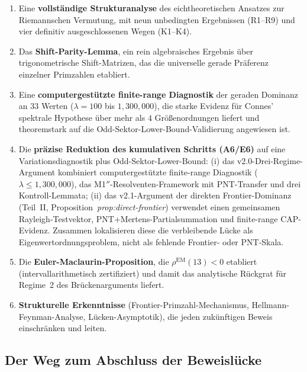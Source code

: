 \documentclass[12pt,a4paper]{article}
\theoremstyle{definition}
\theoremstyle{remark}
\begin{document}
\begin{enumerate}
  \item Eine \textbf{vollständige Strukturanalyse} des eichtheoretischen Ansatzes zur Riemannschen Vermutung, mit neun unbedingten Ergebnissen (R1--R9) und vier definitiv ausgeschlossenen Wegen (K1--K4).

  \item Das \textbf{Shift-Parity-Lemma}, ein rein algebraisches Ergebnis über trigonometrische Shift-Matrizen, das die universelle gerade Präferenz einzelner Primzahlen etabliert.

  \item Eine \textbf{computergestützte finite-range Diagnostik} der geraden Dominanz an $33$ Werten ($\lambda = 100$ bis $1{,}300{,}000$), die starke Evidenz für Connes' spektrale Hypothese über mehr als $4$ Größenordnungen liefert und theoremstark auf die Odd-Sektor-Lower-Bound-Validierung angewiesen ist.

  \item Die \textbf{präzise Reduktion des kumulativen Schritts (A6/E6)} auf eine Variationsdiagnostik plus Odd-Sektor-Lower-Bound: (i) das v2.0-Drei-Regime-Argument kombiniert computergestützte finite-range Diagnostik ($\lambda \leq 1{,}300{,}000$), das M1$''$-Resolventen-Framework mit PNT-Transfer und drei Kontroll-Lemmata; (ii) das v2.1-Argument der direkten Frontier-Dominanz (Teil~II, Proposition~\emph{prop:direct-frontier}) verwendet einen gemeinsamen Rayleigh-Testvektor, PNT+Mertens-Partialsummation und finite-range CAP-Evidenz. Zusammen lokalisieren diese die verbleibende Lücke als Eigenwertordnungsproblem, nicht als fehlende Frontier- oder PNT-Skala.

  \item Die \textbf{Euler-Maclaurin-Proposition}, die $\rho^{\mathrm{EM}}(13) < 0$ etabliert (intervallarithmetisch zertifiziert) und damit das analytische Rückgrat für Regime~2 des Brückenarguments liefert.

  \item \textbf{Strukturelle Erkenntnisse} (Frontier-Primzahl-Mechanismus, Hellmann-Feynman-Analyse, Lücken-Asymptotik), die jeden zukünftigen Beweis einschränken und leiten.
\end{enumerate}

\subsection{Der Weg zum Abschluss der Beweislücke}
\label{sec:gap-closure-path}
\end{document}
